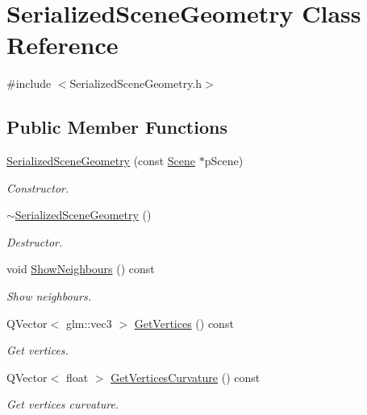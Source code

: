 \hypertarget{class_serialized_scene_geometry}{\section{Serialized\+Scene\+Geometry Class Reference}
\label{class_serialized_scene_geometry}
}


{\ttfamily \#include $<$Serialized\+Scene\+Geometry.\+h$>$}

\subsection*{Public Member Functions}
\begin{DoxyCompactItemize}
\item 
\hyperlink{class_serialized_scene_geometry_a63e5d13db38fdf2cbb9a3099f0e77981}{Serialized\+Scene\+Geometry} (const \hyperlink{class_scene}{Scene} $\ast$p\+Scene)
\begin{DoxyCompactList}\small\item\em Constructor. \end{DoxyCompactList}\item 
\hyperlink{class_serialized_scene_geometry_af1308ad2cbaf6bef88b682617b11ffa7}{$\sim$\+Serialized\+Scene\+Geometry} ()
\begin{DoxyCompactList}\small\item\em Destructor. \end{DoxyCompactList}\item 
void \hyperlink{class_serialized_scene_geometry_aab4947d6b884cfac8fce66488f2c30b3}{Show\+Neighbours} () const 
\begin{DoxyCompactList}\small\item\em Show neighbours. \end{DoxyCompactList}\item 
Q\+Vector$<$ glm\+::vec3 $>$ \hyperlink{class_serialized_scene_geometry_a07f6c88cf4f6d87d3b30b6422899acbc}{Get\+Vertices} () const 
\begin{DoxyCompactList}\small\item\em Get vertices. \end{DoxyCompactList}\item 
Q\+Vector$<$ float $>$ \hyperlink{class_serialized_scene_geometry_a0c93d8628cb51f553525ce2863190035}{Get\+Vertices\+Curvature} () const 
\begin{DoxyCompactList}\small\item\em Get vertices curvature. \end{DoxyCompactList}\item 

\end{DoxyCompactItemize}
